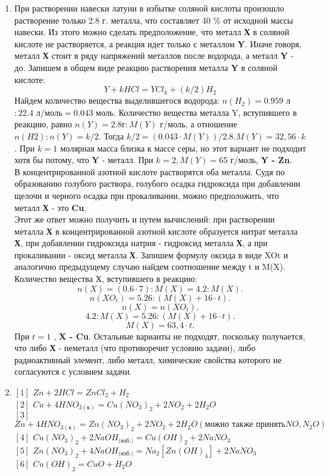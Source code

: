\solutionSection
\begin{enumerate}
    \item При растворении навески латуни в избытке соляной кислоты произошло растворение только 2.8 г. металла, что составляет 40 \% от исходной массы навески. Из этого можно сделать предположение, что металл \textbf{Х} в соляной кислоте не растворяется, а реакция идет только с металлом \textbf{Y}. Иначе говоря, металл \textbf{Х} стоит в ряду напряжений металлов после водорода, а металл \textbf{Y} - до. Запишем в общем виде реакцию растворения металла \textbf{Y}  в соляной кислоте:
    $$Y + kHCl = YCl_k + (k/2)H_2$$
    Найдем количество вещества выделившегося водорода: $n(H_2) = 0.959$ л $: 22.4$ л/моль$ = 0.043$ моль. Количество вещества металла Y, вступившего в реакцию, равно $n(Y) = 2.8 г : M(Y)$ г/моль, а отношение $n(H2) :  n(Y) = k/2$. Тогда $k/2 = (0.043\cdot M(Y))/2.8. M(Y) = 32,56\cdot k$. При $k = 1$ молярная масса близка к массе серы, но этот вариант не подходит хотя бы потому, что \textbf{Y} - металл. При $k = 2, M(Y) = 65$ г/моль, \textbf{Y - Zn}.\\
    В концентрированной азотной кислоте растворятся оба металла. Судя по образованию голубого раствора, голубого осадка гидроксида при добавлении щелочи и черного осадка при прокаливании, можно предположить, что металл \textbf{Х} - это \textbf{Cu}.\\
    Этот же ответ можно получить и путем вычислений: при растворении металла \textbf{Х} в концентрированной азотной кислоте образуется нитрат металла \textbf{Х}, при добавлении гидроксида натрия - гидроксид металла \textbf{Х}, а при прокаливании - оксид металла \textbf{Х}. Запишем формулу оксида в виде XOt и аналогично предыдущему случаю найдем соотношение между t и M(X). Количество вещества Х, вступившего в реакцию:
    $$n(X) = (0.6\cdot7) : M(X) = 4.2 : M(X).$$
    $$n(XO_t) = 5.26 : (M(X) + 16\cdot t).$$
    $$n(X) = n(XO_t).$$
    $$4.2 : M(X) = 5.26 : (M(X) + 16\cdot t).$$
    $$M(X) = 63,4\cdot t.$$
    При $t=1$ , \textbf{X - Cu}. Остальные варианты не подходят, поскольку получается, что либо \textbf{Х} - неметалл (что противоречит условию задачи), либо радиоактивный элемент, либо металл, химические свойства которого не согласуются с условием задачи.
    \item $[1]$ $Zn + 2HCl = ZnCl_2 + H_2$\\
    $[2]$ $Cu + 4HNO_{3(\text{к})}  = Cu(NO_3)_2 + 2NO_2 + 2H_2O$\\
    $[3]$ $Zn + 4HNO_{3(\text{к})} = Zn(NO_3)_2 + 2NO_2 + 2H_2O (\text{можно также принять} NO, N_2O)$\\
    $[4]$ $Cu(NO_3)_2 + 2NaOH_\text{(изб.)} = Cu(OH)_2 + 2NaNO_3$\\
    $[5]$ $Zn(NO_3)_2 + 4NaOH_\text{(изб.)} = Na_2[Zn(OH)_4] + 2NaNO_3$\\
    $[6]$ $Cu(OH)_2 = CuO + H_2O$
\end{enumerate}